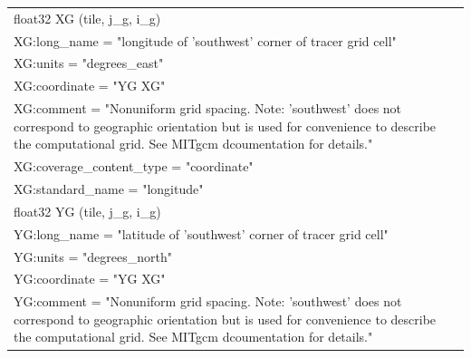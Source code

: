 \begin{longtable}{|p{\textwidth}|}
\rowcolor{Apricot}\hspace{0.5cm}float32 XG (tile, j\_g, i\_g)\\
\rowcolor{Apricot}\hspace{0.5cm}\hspace{0.5cm}XG:long\_name = "longitude of 'southwest' corner of tracer grid cell"\\
\rowcolor{Apricot}\hspace{0.5cm}\hspace{0.5cm}XG:units = "degrees\_east"\\
\rowcolor{Apricot}\hspace{0.5cm}\hspace{0.5cm}XG:coordinate = "YG XG"\\
\rowcolor{Apricot}\hspace{0.5cm}\hspace{0.5cm}XG:comment = "Nonuniform grid spacing. Note: 'southwest' does not correspond to geographic orientation but is used for convenience to describe the computational grid. See MITgcm dcoumentation for details."\\
\rowcolor{Apricot}\hspace{0.5cm}\hspace{0.5cm}XG:coverage\_content\_type = "coordinate"\\
\rowcolor{Apricot}\hspace{0.5cm}\hspace{0.5cm}XG:standard\_name = "longitude"\\
\rowcolor{Apricot}\hspace{0.5cm}float32 YG (tile, j\_g, i\_g)\\
\rowcolor{Apricot}\hspace{0.5cm}\hspace{0.5cm}YG:long\_name = "latitude of 'southwest' corner of tracer grid cell"\\
\rowcolor{Apricot}\hspace{0.5cm}\hspace{0.5cm}YG:units = "degrees\_north"\\
\rowcolor{Apricot}\hspace{0.5cm}\hspace{0.5cm}YG:coordinate = "YG XG"\\
\rowcolor{Apricot}\hspace{0.5cm}\hspace{0.5cm}YG:comment = "Nonuniform grid spacing. Note: 'southwest' does not correspond to geographic orientation but is used for convenience to describe the computational grid. See MITgcm dcoumentation for details."\\

\end{longtable}

